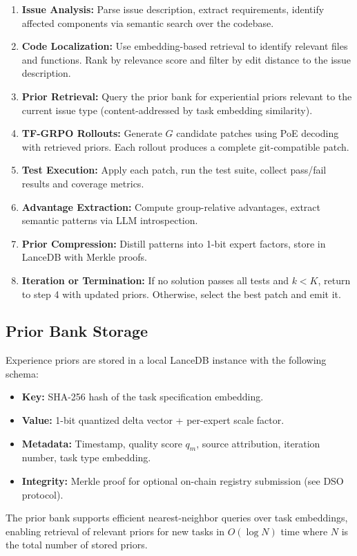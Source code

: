 \begin{enumerate}[leftmargin=1.5em]
    \item \textbf{Issue Analysis:} Parse issue description, extract requirements,
          identify affected components via semantic search over the codebase.
    \item \textbf{Code Localization:} Use embedding-based retrieval to identify
          relevant files and functions. Rank by relevance score and filter by
          edit distance to the issue description.
    \item \textbf{Prior Retrieval:} Query the prior bank for experiential priors
          relevant to the current issue type (content-addressed by task
          embedding similarity).
    \item \textbf{TF-GRPO Rollouts:} Generate $G$ candidate patches using PoE
          decoding with retrieved priors. Each rollout produces a complete
          git-compatible patch.
    \item \textbf{Test Execution:} Apply each patch, run the test suite, collect
          pass/fail results and coverage metrics.
    \item \textbf{Advantage Extraction:} Compute group-relative advantages,
          extract semantic patterns via LLM introspection.
    \item \textbf{Prior Compression:} Distill patterns into 1-bit expert factors,
          store in LanceDB with Merkle proofs.
    \item \textbf{Iteration or Termination:} If no solution passes all tests
          and $k < K$, return to step 4 with updated priors. Otherwise, select
          the best patch and emit it.
\end{enumerate}

\subsection{Prior Bank Storage}

Experience priors are stored in a local LanceDB instance with the following schema:
\begin{itemize}[leftmargin=1.5em]
    \item \textbf{Key:} SHA-256 hash of the task specification embedding.
    \item \textbf{Value:} 1-bit quantized delta vector + per-expert scale factor.
    \item \textbf{Metadata:} Timestamp, quality score $q_m$, source attribution,
          iteration number, task type embedding.
    \item \textbf{Integrity:} Merkle proof for optional on-chain registry
          submission (see DSO protocol).
\end{itemize}

The prior bank supports efficient nearest-neighbor queries over task embeddings,
enabling retrieval of relevant priors for new tasks in $O(\log N)$ time where
$N$ is the total number of stored priors.

